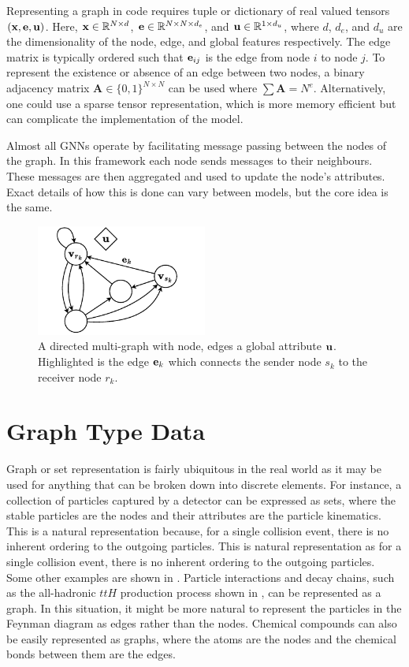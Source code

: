 Representing a graph in code requires tuple or dictionary of real valued tensors $(\mathbf{x}, \mathbf{e}, \mathbf{u})$.
Here, $\mathbf{x} \in \mathbb{R}^{N \times d}$, $\mathbf{e} \in \mathbb{R}^{N \times N \times d_e}$, and $\mathbf{u} \in \mathbb{R}^{1 \times d_u}$, where $d$, $d_e$, and $d_u$ are the dimensionality of the node, edge, and global features respectively.
The edge matrix is typically ordered such that $\mathbf{e}_{ij}$ is the edge from node $i$ to node $j$.
To represent the existence or absence of an edge between two nodes, a binary adjacency matrix $\mathbf{A} \in \{0, 1\}^{N \times N}$ can be used where $\sum{\mathbf{A}} = N^e$.
Alternatively, one could use a sparse tensor representation, which is more memory efficient but can complicate the implementation of the model.

Almost all GNNs operate by facilitating message passing between the nodes of the graph.
In this framework each node sends messages to their neighbours.
These messages are then aggregated and used to update the node's attributes.
Exact details of how this is done can vary between models, but the core idea is the same.

\begin{figure}
    \centering
    \includegraphics[width=0.5\textwidth]{Figures/transformers/graphs.pdf}
    \caption{A directed multi-graph with node, edges a global attribute $\mathbf{u}$. Highlighted is the edge $\mathbf{e}_{k}$ which connects the sender node $s_k$ to the receiver node $r_k$.}
    \label{fig:graph}
\end{figure}

\section{Graph Type Data}

Graph or set representation is fairly ubiquitous in the real world as it may be used for anything that can be broken down into discrete elements.
For instance, a collection of particles captured by a detector can be expressed as sets, where the stable particles are the nodes and their attributes are the particle kinematics.
This is a natural representation because, for a single collision event, there is no inherent ordering to the outgoing particles.
This is natural representation as for a single collision event, there is no inherent ordering to the outgoing particles.
Some other examples are shown in .
Particle interactions and decay chains, such as the all-hadronic $ttH$ production process shown in , can be represented as a graph.
In this situation, it might be more natural to represent the particles in the Feynman diagram as edges rather than the nodes.
Chemical compounds can also be easily represented as graphs, where the atoms are the nodes and the chemical bonds between them are the edges.

